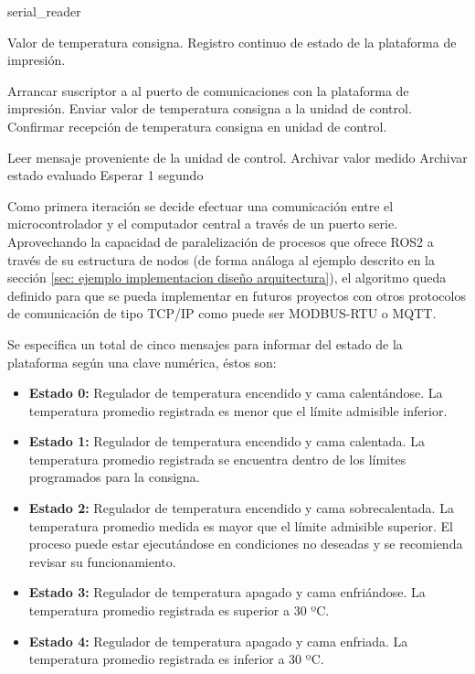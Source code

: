 \begin{algorithm}[h!]
\caption{serial\_reader}\label{alg:algoritmo lectura estado plataforma de impresión}
\begin{algorithmic}[1]
\Require Valor de temperatura consigna.
\Ensure Registro continuo de estado de la plataforma de impresión.

\State Arrancar suscriptor a al puerto de comunicaciones con la plataforma de impresión.
\State Enviar valor de temperatura consigna a la unidad de control.
\State Confirmar recepción de temperatura consigna en unidad de control.

\State Leer mensaje proveniente de la unidad de control.
\State Archivar valor medido
\State Archivar estado evaluado
\State Esperar 1 segundo
\EndWhile

\end{algorithmic}
\end{algorithm}


Como primera iteración se decide efectuar una comunicación entre el microcontrolador y el computador central a través de un puerto serie. Aprovechando la capacidad de paralelización de procesos que ofrece ROS2 a través de su estructura de nodos (de forma análoga al ejemplo descrito en la sección \ref{sec: ejemplo implementacion diseño arquitectura}), el algoritmo queda definido para que se pueda implementar en futuros proyectos con otros protocolos de comunicación de tipo \acrshort{TCP/IP} como puede ser MODBUS-RTU o MQTT.

Se especifica un total de cinco mensajes para informar del estado de la plataforma según una clave numérica, éstos son:
\begin{itemize}
    \item \textbf{Estado 0:} Regulador de temperatura encendido y cama calentándose. La temperatura promedio registrada es menor que el límite admisible inferior.
    \item \textbf{Estado 1:} Regulador de temperatura encendido y cama calentada. La temperatura promedio registrada se encuentra dentro de los límites programados para la consigna.
    \item \textbf{Estado 2:} Regulador de temperatura encendido y cama sobrecalentada. La temperatura promedio medida es mayor que el límite admisible superior. El proceso puede estar ejecutándose en condiciones no deseadas y se recomienda revisar su funcionamiento.
    \item \textbf{Estado 3:} Regulador de temperatura apagado y cama enfriándose. La temperatura promedio registrada es superior a 30 ºC.
    \item \textbf{Estado 4:} Regulador de temperatura apagado y cama enfriada. La temperatura promedio registrada es inferior a 30 ºC.
\end{itemize}


